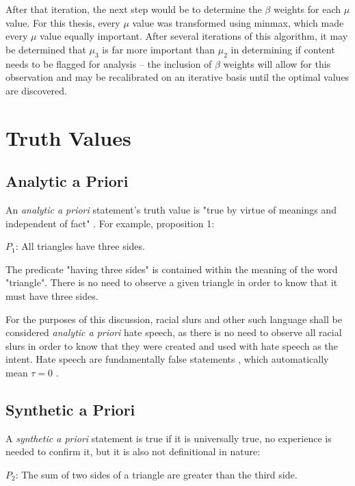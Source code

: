 \documentclass[preprint,review,12pt]{elsarticle}
\begin{document}
After that iteration, the next step would be to determine the $\beta$ weights for each $\mu$ value. For this thesis, every $\mu$ value was transformed using minmax, which made every $\mu$ value equally important. After several iterations of this algorithm, it may be determined that $\mu_3$ is far more important than $\mu_2$ in determining if content needs to be flagged for analysis -- the inclusion of $\beta$ weights will allow for this observation and may be recalibrated on an iterative basis until the optimal values are discovered.


\appendix

\section{Truth Values}
\label{truthvalue appendix}
\subsection{Analytic a Priori}
An \textit{analytic a priori} statement's truth value is "true by virtue of meanings and independent of fact" \cite{quine1951main}. 
For example, proposition 1: \begin{center}
    $P_1$: All triangles have three sides.
\end{center}
The predicate "having three sides" is contained within the meaning of the word "triangle". There is no need to observe a given triangle in order to know that it must have three sides.

For the purposes of this discussion, racial slurs and other such language shall be considered \textit{analytic a priori} hate speech, as there is no need to observe all racial slurs in order to know that they were created and used with hate speech as the intent. Hate speech are fundamentally false statements \cite{waldron2012harm}, which automatically mean $\tau = 0$ .

\subsection{Synthetic a Priori}
A \textit{synthetic a priori} statement is true if it is universally true, no experience is needed to confirm it, but it is also not definitional in nature:
\begin{center}
    $P_2$: The sum of two sides of a triangle are greater than the third side.
\end{center}
 
\end{document}
